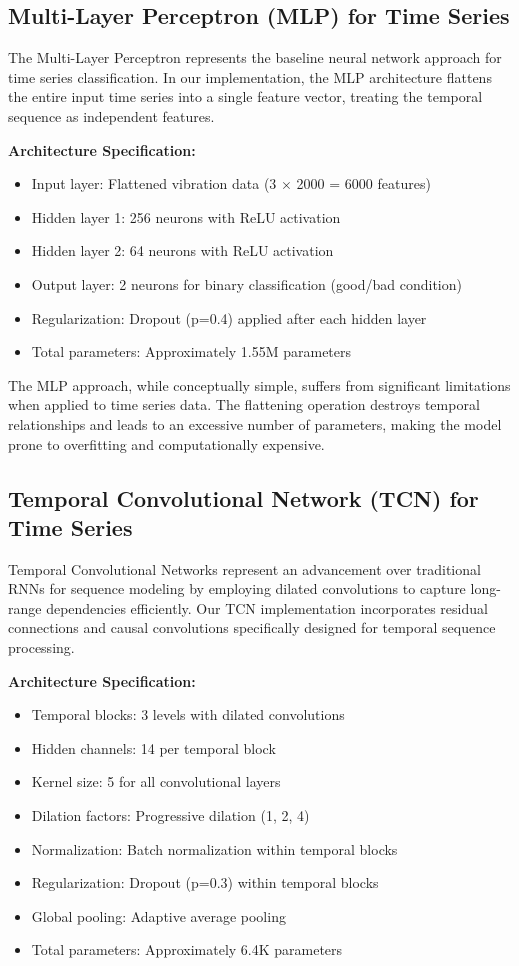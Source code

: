 \documentclass[12pt]{article}
\begin{document}
\subsection{Multi-Layer Perceptron (MLP) for Time Series}

The Multi-Layer Perceptron represents the baseline neural network approach for time series classification. In our implementation, the MLP architecture flattens the entire input time series into a single feature vector, treating the temporal sequence as independent features.

\textbf{Architecture Specification:}
\begin{itemize}
    \item Input layer: Flattened vibration data (3 $\times$ 2000 = 6000 features)
    \item Hidden layer 1: 256 neurons with ReLU activation
    \item Hidden layer 2: 64 neurons with ReLU activation  
    \item Output layer: 2 neurons for binary classification (good/bad condition)
    \item Regularization: Dropout (p=0.4) applied after each hidden layer
    \item Total parameters: Approximately 1.55M parameters
\end{itemize}

The MLP approach, while conceptually simple, suffers from significant limitations when applied to time series data. The flattening operation destroys temporal relationships and leads to an excessive number of parameters, making the model prone to overfitting and computationally expensive.

\subsection{Temporal Convolutional Network (TCN) for Time Series}

Temporal Convolutional Networks represent an advancement over traditional RNNs for sequence modeling by employing dilated convolutions to capture long-range dependencies efficiently. Our TCN implementation incorporates residual connections and causal convolutions specifically designed for temporal sequence processing.

\textbf{Architecture Specification:}
\begin{itemize}
    \item Temporal blocks: 3 levels with dilated convolutions
    \item Hidden channels: 14 per temporal block
    \item Kernel size: 5 for all convolutional layers
    \item Dilation factors: Progressive dilation (1, 2, 4)
    \item Normalization: Batch normalization within temporal blocks
    \item Regularization: Dropout (p=0.3) within temporal blocks
    \item Global pooling: Adaptive average pooling
    \item Total parameters: Approximately 6.4K parameters
\end{itemize}
\end{document}
